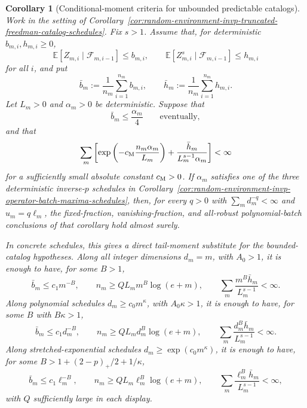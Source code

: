 \documentclass[11pt]{amsart}
\numberwithin{equation}{section}
\newtheorem{corollary}[theorem]{Corollary}
\theoremstyle{definition}
\theoremstyle{remark}
\newcommand{\Exp}{\mathbb E}
\begin{document}
\begin{corollary}[Conditional-moment criteria for unbounded predictable catalogs]
\label{cor:random-environment-invp-moment-freedman-catalog-schedules}
Work in the setting of
Corollary~\ref{cor:random-environment-invp-truncated-freedman-catalog-schedules}.
Fix \(s>1\).  Assume that, for deterministic \(b_{m,i},h_{m,i}\ge0\),
\[
  \Exp[Z_{m,i}\mid\mathcal F_{m,i-1}]\le b_{m,i},
  \qquad
  \Exp[Z_{m,i}^s\mid\mathcal F_{m,i-1}]\le h_{m,i}
\]
for all \(i\), and put
\[
  \bar b_m:=\frac1{n_m}\sum_{i=1}^{n_m}b_{m,i},
  \qquad
  \bar h_m:=\frac1{n_m}\sum_{i=1}^{n_m}h_{m,i}.
\]
Let \(L_m>0\) and \(\alpha_m>0\) be deterministic.  Suppose that
\[
  \bar b_m\le \frac{\alpha_m}{4}
  \qquad\text{eventually},
\]
and that
\[
  \sum_m
  \left[
    \exp\left(-c_{\rm M}\frac{n_m\alpha_m}{L_m}\right)
    +\frac{\bar h_m}{L_m^{s-1}\alpha_m}
  \right]<\infty
\]
for a sufficiently small absolute constant \(c_{\rm M}>0\).  If
\(\alpha_m\) satisfies one of the three deterministic inverse-\(p\) schedules in
Corollary~\ref{cor:random-environment-invp-operator-batch-maxima-schedules},
then, for every \(q>0\) with \(\sum_m d_m^{-q}<\infty\) and \(u_m=q\ell_m\),
the fixed-fraction, vanishing-fraction, and all-robust polynomial-batch
conclusions of that corollary hold almost surely.

In concrete schedules, this gives a direct tail-moment substitute for the
bounded-catalog hypotheses.  Along all integer dimensions \(d_m=m\), with
\(A_0>1\), it is enough to have, for some \(B>1\),
\[
  \bar b_m\le c_1m^{-B},
  \qquad
  n_m\ge QL_mm^B\log(e+m),
  \qquad
  \sum_m\frac{m^B\bar h_m}{L_m^{s-1}}<\infty .
\]
Along polynomial schedules \(d_m\ge c_0m^\kappa\), with \(A_0\kappa>1\), it is
enough to have, for some \(B\) with \(B\kappa>1\),
\[
  \bar b_m\le c_1d_m^{-B},
  \qquad
  n_m\ge QL_md_m^B\log(e+m),
  \qquad
  \sum_m\frac{d_m^B\bar h_m}{L_m^{s-1}}<\infty .
\]
Along stretched-exponential schedules \(d_m\ge\exp(c_0m^\kappa)\), it is enough
to have, for some \(B>1+(2-p)_+/2+1/\kappa\),
\[
  \bar b_m\le c_1\ell_m^{-B},
  \qquad
  n_m\ge QL_m\ell_m^B\log(e+m),
  \qquad
  \sum_m\frac{\ell_m^B\bar h_m}{L_m^{s-1}}<\infty ,
\]
with \(Q\) sufficiently large in each display.
\end{corollary}
\end{document}
